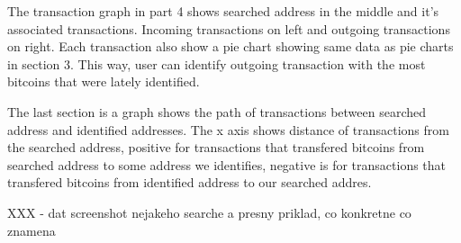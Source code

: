 \documentclass[
  digital, %
  table,   %
  lof,     %
  lot,     %
  oneside
]{fithesis3}
\begin{document}
\begin{appendices}
The transaction graph in part 4 shows searched address in the middle and it's associated transactions.
Incoming transactions on left and outgoing transactions on right. Each transaction also show a pie chart showing
same data as pie charts in section 3. This way, user can identify outgoing transaction with the most bitcoins that were lately identified.

The last section is a graph shows the path of transactions between searched address and identified addresses.
The x axis shows distance of transactions from the searched address, positive for transactions that transfered bitcoins
from searched address to some address we identifies, negative is for transactions that transfered bitcoins
from identified address to our searched addres.

XXX - dat screenshot nejakeho searche a presny priklad, co konkretne co znamena

\end{appendices}

\printbibliography
\end{document}
